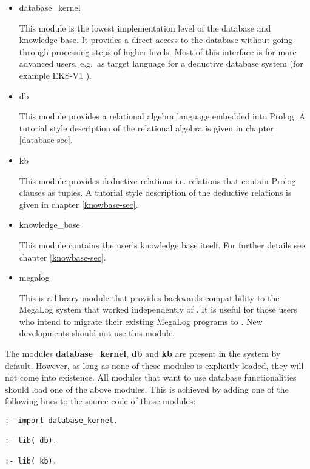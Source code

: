 \begin{itemize}

\item{database\_kernel}

This module is the lowest implementation level of the database and knowledge
base. It provides a direct access to the database without going through
processing steps of higher levels. Most of this interface is for more
advanced users, e.g.\ as target language for a deductive database system
(for example EKS-V1 \cite{EKS91}).

\item{db}

This module provides a relational algebra language embedded into
Prolog. A tutorial style description of the relational algebra
is given in chapter \ref{database-sec}.

\item{kb}

This module provides deductive relations i.e. relations that contain
Prolog clauses as tuples. A tutorial style description of the 
deductive relations is given in chapter \ref{knowbase-sec}.

\item{knowledge\_base}

This module contains the user's knowledge base itself. For further details
see chapter \ref{knowbase-sec}.

\item{megalog}

This is a library module that provides backwards compatibility to the
MegaLog system
that worked independently of {\eclipse}. It is useful for those users who
intend to migrate their existing MegaLog programs to \eclipse.
New developments should not use this module.

\end{itemize}

The modules {\bf database\_kernel}, {\bf db} and {\bf kb}
are present in the system by default.
However, as long as none of these modules is explicitly loaded, they
will not come into existence.
All modules that want to use database functionalities should load one of
the above modules. This is achieved by adding one of the following lines
to the source code of those modules:

\begin{verbatim}
:- import database_kernel.

:- lib( db).

:- lib( kb).
\end{verbatim}


